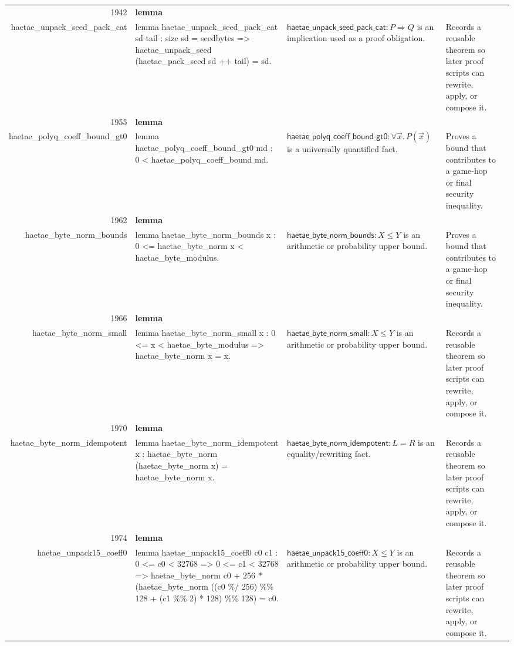 \documentclass[10pt]{article}
\newcommand{\ec}[1]{\begingroup\ttfamily\scriptsize #1\endgroup}
\begin{document}
\begin{longtable}{r L{0.17\textwidth} L{0.26\textwidth} L{0.27\textwidth} L{0.20\textwidth}}
1942 & \textbf{lemma}\\\ec{haetae\_unpack\_seed\_pack\_cat} & \ec{lemma haetae\_unpack\_seed\_pack\_cat sd tail : size sd = seedbytes => haetae\_unpack\_seed (haetae\_pack\_seed sd ++ tail) = sd.} & \(\mathsf{haetae\_unpack\_seed\_pack\_cat} : P \Rightarrow Q\) is an implication used as a proof obligation. & Records a reusable theorem so later proof scripts can rewrite, apply, or compose it. \\
1955 & \textbf{lemma}\\\ec{haetae\_polyq\_coeff\_bound\_gt0} & \ec{lemma haetae\_polyq\_coeff\_bound\_gt0 md : 0 < haetae\_polyq\_coeff\_bound md.} & \(\mathsf{haetae\_polyq\_coeff\_bound\_gt0} : \forall \vec{x}.\, P(\vec{x})\) is a universally quantified fact. & Proves a bound that contributes to a game-hop or final security inequality. \\
1962 & \textbf{lemma}\\\ec{haetae\_byte\_norm\_bounds} & \ec{lemma haetae\_byte\_norm\_bounds x : 0 <= haetae\_byte\_norm x < haetae\_byte\_modulus.} & \(\mathsf{haetae\_byte\_norm\_bounds} : X \le Y\) is an arithmetic or probability upper bound. & Proves a bound that contributes to a game-hop or final security inequality. \\
1966 & \textbf{lemma}\\\ec{haetae\_byte\_norm\_small} & \ec{lemma haetae\_byte\_norm\_small x : 0 <= x < haetae\_byte\_modulus => haetae\_byte\_norm x = x.} & \(\mathsf{haetae\_byte\_norm\_small} : X \le Y\) is an arithmetic or probability upper bound. & Records a reusable theorem so later proof scripts can rewrite, apply, or compose it. \\
1970 & \textbf{lemma}\\\ec{haetae\_byte\_norm\_idempotent} & \ec{lemma haetae\_byte\_norm\_idempotent x : haetae\_byte\_norm (haetae\_byte\_norm x) = haetae\_byte\_norm x.} & \(\mathsf{haetae\_byte\_norm\_idempotent} : L = R\) is an equality/rewriting fact. & Records a reusable theorem so later proof scripts can rewrite, apply, or compose it. \\
1974 & \textbf{lemma}\\\ec{haetae\_unpack15\_coeff0} & \ec{lemma haetae\_unpack15\_coeff0 c0 c1 : 0 <= c0 < 32768 => 0 <= c1 < 32768 => haetae\_byte\_norm c0 + 256 * (haetae\_byte\_norm ((c0 \%/ 256) \%\% 128 + (c1 \%\% 2) * 128) \%\% 128) = c0.} & \(\mathsf{haetae\_unpack15\_coeff0} : X \le Y\) is an arithmetic or probability upper bound. & Records a reusable theorem so later proof scripts can rewrite, apply, or compose it. \\

\end{longtable}
\end{document}

